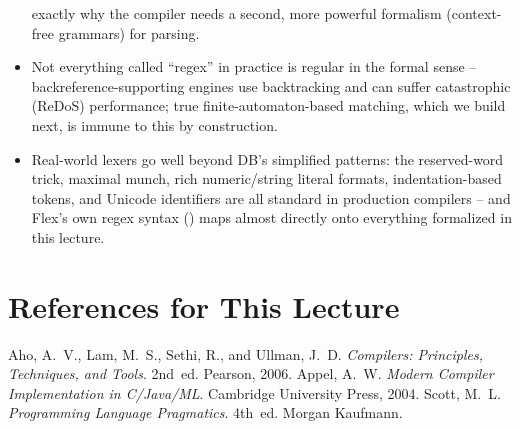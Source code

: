 \documentclass[full-course-notes.tex]{subfiles}
\begin{document}
\begin{takeaways}
\begin{itemize}
  exactly why the compiler needs a second, more powerful formalism (context-free grammars) for
  parsing.
  \item Not everything called ``regex'' in practice is regular in the formal sense --
  backreference-supporting engines use backtracking and can suffer catastrophic (ReDoS)
  performance; true finite-automaton-based matching, which we build next, is immune to this by
  construction.
  \item Real-world lexers go well beyond DB's simplified patterns: the reserved-word trick,
  maximal munch, rich numeric/string literal formats, indentation-based tokens, and Unicode
  identifiers are all standard in production compilers -- and Flex's own regex syntax
  () maps almost directly onto everything formalized in this lecture.
\end{itemize}
\end{takeaways}

\section*{References for This Lecture}
\begin{thebibliography}{99}
 Aho, A.~V., Lam, M.~S., Sethi, R., and Ullman, J.~D. \textit{Compilers:
Principles, Techniques, and Tools}. 2nd~ed. Pearson, 2006.
 Appel, A.~W. \textit{Modern Compiler Implementation in C/Java/ML}. Cambridge
University Press, 2004.
 Scott, M.~L. \textit{Programming Language Pragmatics}. 4th~ed. Morgan
Kaufmann.
\end{thebibliography}
\end{document}
